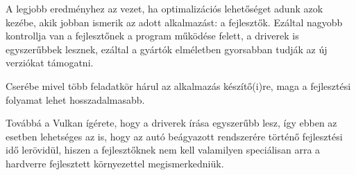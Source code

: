 A legjobb eredm\'enyhez az vezet, ha optimaliz\'aci\'os lehet\H os\'eget adunk azok kez\'ebe, akik jobban ismerik az adott alkalmaz\'ast: a fejleszt\H ok.
Ez\'altal nagyobb kontrollja van a fejleszt\H onek a program m\H uk\"od\'ese felett, a driverek is egyszer\H ubbek lesznek, ez\'altal a gy\'art\'ok elm\'eletben gyorsabban tudj\'ak az \'uj verzi\'okat t\'amogatni.

Cser\'ebe mivel t\"obb feladatk\"or h\'arul az alkalmaz\'as k\'esz\'it\H o(i)re, maga a fejleszt\'esi folyamat lehet hosszadalmasabb.


Tov\'abb\'a a Vulkan \'ig\'erete, hogy a driverek \'ir\'asa egyszer\H ubb lesz, \'igy ebben az esetben lehets\'eges az is, hogy az aut\'o be\'agyazott rendszer\'ere t\"ort\'en\H o fejleszt\'esi id\H o ler\"ovid\"ul, hiszen a fejleszt\H oknek nem kell valamilyen speci\'alisan arra a hardverre fejlesztett k\"ornyezettel megismerkedni\"uk. 

